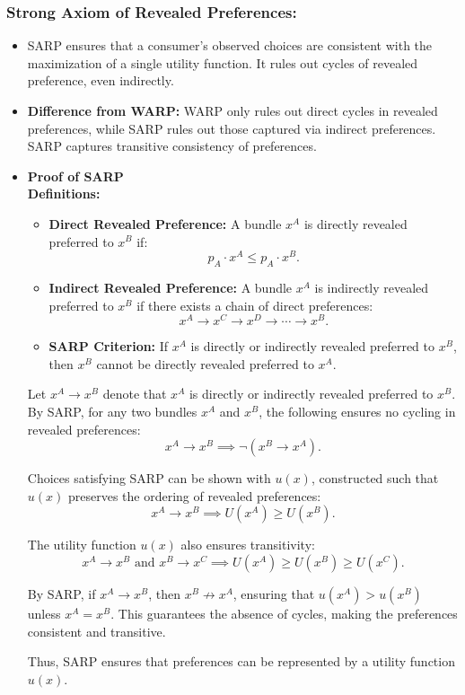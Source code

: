 \documentclass{article}
\begin{document}
\subsubsection{Strong Axiom of Revealed Preferences:}
\begin{itemize}
    \item SARP ensures that a consumer’s observed choices are consistent with the maximization of a single utility function. It rules out cycles of revealed preference, even indirectly.
    \item \textbf{Difference from WARP:} WARP only rules out direct cycles in revealed preferences, while SARP rules out those captured via indirect preferences. SARP captures transitive consistency of preferences. 
    \item \textbf{Proof of SARP} \\ 
\textbf{Definitions:}
\begin{itemize}
    \item \textbf{Direct Revealed Preference:} A bundle \(x^A\) is directly revealed preferred to \(x^B\) if:
    \[
    p_A \cdot x^A \leq p_A \cdot x^B.
    \]
    \item \textbf{Indirect Revealed Preference:} A bundle \(x^A\) is indirectly revealed preferred to \(x^B\) if there exists a chain of direct preferences:
    \[
    x^A \to x^C \to x^D \to \cdots \to x^B.
    \]
    \item \textbf{SARP Criterion:} If \(x^A\) is directly or indirectly revealed preferred to \(x^B\), then \(x^B\) cannot be directly revealed preferred to \(x^A\).
\end{itemize}

Let \(x^A \to x^B\) denote that \(x^A\) is directly or indirectly revealed preferred to \(x^B\). By SARP, for any two bundles \(x^A\) and \(x^B\), the following ensures no cycling in revealed preferences:
\[
x^A \to x^B \implies \neg (x^B \to x^A).
\]

Choices satisfying SARP can be shown with \(u(x)\), constructed such that \(u(x)\) preserves the ordering of revealed preferences:
\[
x^A \to x^B \implies U(x^A) \geq U(x^B).
\]

The utility function \(u(x)\) also ensures transitivity:
\[
x^A \to x^B \text{ and } x^B \to x^C \implies U(x^A) \geq U(x^B) \geq U(x^C).
\]

By SARP, if \(x^A \to x^B\), then \(x^B \not\to x^A\), ensuring that \(u(x^A) > u(x^B)\) unless \(x^A = x^B\). This guarantees the absence of cycles, making the preferences consistent and transitive.

Thus, SARP ensures that preferences can be represented by a utility function \(u(x)\).
\end{itemize}
\end{document}
